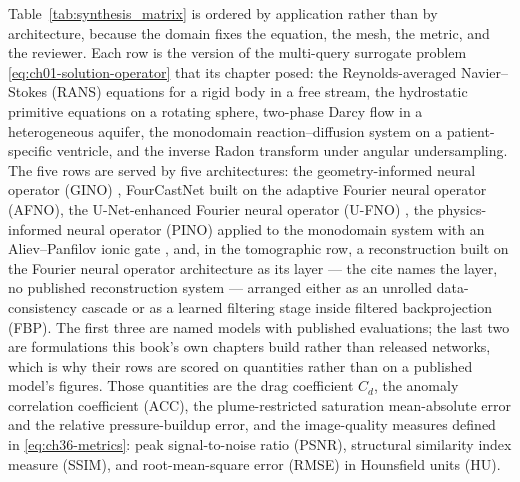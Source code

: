 Table~\ref{tab:synthesis_matrix} is ordered by application rather than by architecture,
because the domain fixes the equation, the mesh, the metric, and the reviewer. Each row is
the version of the multi-query surrogate problem \eqref{eq:ch01-solution-operator} that its
chapter posed: the Reynolds-averaged Navier--Stokes (RANS) equations for a rigid body in a
free stream, the hydrostatic primitive equations on a rotating sphere, two-phase Darcy flow
in a heterogeneous aquifer, the monodomain reaction--diffusion system on a patient-specific
ventricle, and the inverse Radon transform under angular
undersampling.
The five rows are served by five architectures: the geometry-informed neural operator (GINO)
\cite{li2023geometry}, FourCastNet \cite{pathak2022fourcastnet} built on the adaptive Fourier
neural operator (AFNO), the U-Net-enhanced Fourier neural operator (U-FNO)
\cite{wen2022ufno}, the physics-informed neural operator (PINO) \cite{li2021physics}
applied to the monodomain system with an Aliev--Panfilov ionic gate
\cite{aliev1996simple}, and, in the tomographic row, a reconstruction built on the
Fourier neural operator architecture \cite{li2021fourier} as its layer --- the cite
names the layer, no published reconstruction system --- arranged either as an unrolled data-consistency
cascade or as a learned filtering stage inside filtered backprojection (FBP). The first
three are named models with published evaluations; the last two are formulations this
book's own chapters build rather than released networks, which is why their rows are
scored on quantities rather than on a published model's figures. Those quantities are the
drag coefficient $C_d$, the anomaly
correlation coefficient (ACC), the plume-restricted saturation mean-absolute error and the
relative pressure-buildup error, and the
image-quality measures defined in \eqref{eq:ch36-metrics}: peak signal-to-noise ratio
(PSNR), structural similarity index measure (SSIM), and root-mean-square error (RMSE) in
Hounsfield units (HU).

